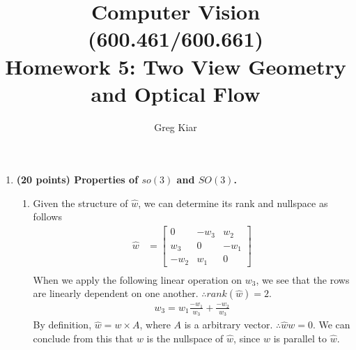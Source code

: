 \documentclass[10pt]{article}
\begin{document}
\title{
\vspace{-19mm}
Computer Vision (600.461/600.661)\\
Homework 5: Two View Geometry and Optical Flow}
\author{Greg Kiar}


\maketitle

\begin{enumerate}

\item \textbf{(20 points) Properties of $so(3)$ and $SO(3)$.}
\begin{enumerate}

\item Given the structure of $\hat{w}$, we can determine its rank and nullspace as follows
\begin{align*} \hat{w} &= \begin{bmatrix} 0 & -w_3 & w_2 \\ w_3 & 0 & -w_1 \\ -w_2 & w_1 & 0 \end{bmatrix} \\
\end{align*}
When we apply the following linear operation on $w_3$, we see that the rows are linearly dependent on one another. $\therefore rank(\hat{w}) = 2$.
\begin{align*} w_3 = w_1 \frac{-w_1}{w_3} + \frac{-w_2}{w_3} \end{align*}
By definition, $\hat{w} = w \times A$, where $A$ is a arbitrary vector. $\therefore \hat{w} w = 0$. We can conclude from this that $w$ is the nullspace of $\hat{w}$, since $w$ is parallel to $\hat{w}$.


\end{enumerate}
\end{enumerate}
\end{document}
